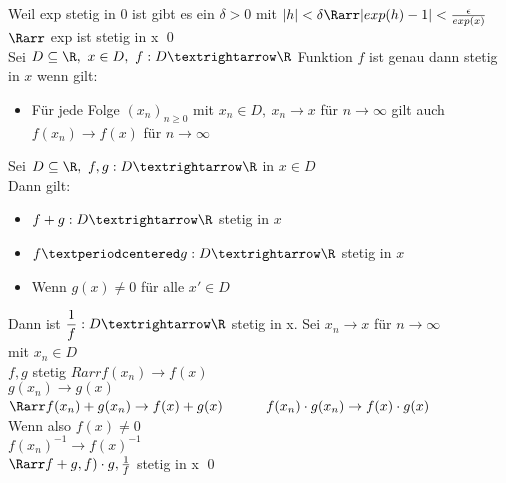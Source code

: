 Weil exp stetig in 0 ist gibt es ein $\delta > 0$ mit $|h| < \delta \Rarr |exp(h) -1| < \frac{\epsilon}{exp(x)}$\\
$\Rarr$ exp ist stetig in x \qed\\
%
Sei $D\subseteq\R,\ x\in D,\ f:D→\R$ Funktion $f$ ist genau dann stetig in $x$ wenn gilt:\\
\begin{itemize}
\item{Für jede Folge $(x_n)_{n\geq 0}$ mit $x_n\in D,\ x_n→x$ für $n→∞$ gilt auch $f(x_n)→f(x)$ für $n→∞$}
\end{itemize}
%
Sei $D\subseteq\R,\ f,g:D→\R$ in $x\in D$\\
Dann gilt:\\
\begin{itemize}
\item{$f+g:D→\R$ stetig in $x$}
\item{$f·g:D→\R$ stetig in $x$}
\item{Wenn $g(x)\neq 0$ für alle $x'\in D$}
\end{itemize}
Dann ist $\dfrac{1}{f}:D→\R$ stetig in x.
Sei $x_n \to x$ für $n \to \infty$\\
mit $x_n \in D$\\
$f, g$ stetig $Rarr f(x_n) \to f(x)$ \\
\phantom{$f, g$ stetig $Rarr$} $g(x_n) \to g(x)$\\
$\Rarr f(x_n) + g(x_n) \to f(x) + g(x)$
$\phantom{\Rarr} f(x_n) \cdot g(x_n) \to f(x) \cdot g(x)$\\
Wenn also $f(x) \neq 0$\\
$f(x_n)^{-1} \to f(x)^{-1}$\\
$\Rarr f + g, f) \cdot g, \frac{1}{f}$ stetig in x \qed